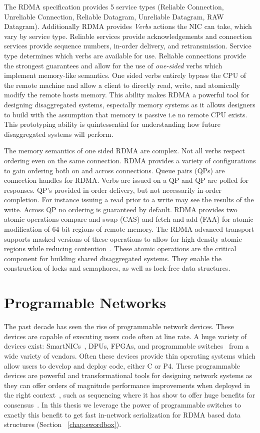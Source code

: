\documentclass[12pt]{ucsddissertation}
\begin{document}
The RDMA specification provides 5 service types (Reliable Connection, Unreliable Connection,
Reliable Datagram, Unreliable Datagram, RAW Datagram). Additionally RDMA provides \textit{Verbs}
actions the NIC can take, which vary by service type. Reliable services provide acknowledgements and
connection services provide sequence numbers, in-order delivery, and retransmission. Service type
determines which verbs are available for use. Reliable connections provide the strongest guarantees
and allow for the use of \textit{one-sided} verbs which implement memory-like semantics. One sided
verbs entirely bypass the CPU of the remote machine and allow a client to directly read, write, and
atomically modify the remote hosts memory. This ability makes RDMA a powerful tool for designing
disaggregated systems, especially memory systems as it allows designers to build with the assumption
that memory is passive i.e no remote CPU exists. This prototyping ability is quintessential for
understanding how future disaggregated systems will perform.

The memory semantics of one sided RDMA are complex. Not all verbs respect ordering even on the same
connection. RDMA provides a variety of configurations to gain ordering both on and across
connections. Queue pairs (QPs) are connection handles for RDMA. Verbs are issued on a QP and QP are
polled for responses. QP's provided in-order delivery, but not necessarily in-order completion. For
instance issuing a read prior to a write may see the results of the write. Across QP no ordering is
guaranteed by default. RDMA provides two atomic operations compare and swap (CAS) and fetch and add
(FAA) for atomic modification of 64 bit regions of remote memory. The RDMA advanced transport
supports masked versions of these operations to allow for high density atomic regions while reducing
contention~\cite{rdma-masked-cas}. These atomic operations are the critical component for building
shared disaggregated systems. They enable the construction of locks and semaphores, as well as
lock-free data structures.


\section{Programable Networks}

The past decade has seen the rise of programmable network devices. These devices are capable of
executing users code often at line rate. A huge variety of devices exist: SmartNICs~\cite{fairnic},
DPUs, FPGAs, and programmable switches~\cite{p4} from a wide variety of vendors. Often these devices
provide thin operating systems which allow users to develop and deploy code, either C or P4. These
programmable devices are powerful and transformational tools for designing network systems as they
can offer orders of magnitude performance improvements when deployed in the right
context~\cite{when-computer}, such as sequencing where it has show to offer huge benefits for
consensus~\cite{eris, nopaxos}. In this thesis we leverage the power of programmable switches to
exactly this benefit to get fast in-network serialization for RDMA based data structures (Section
~\ref{chap:swordbox}).
\end{document}
